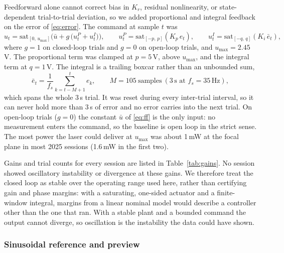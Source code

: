 Feedforward alone cannot correct bias in $K_r$, residual nonlinearity, or state-dependent trial-to-trial deviation, so we added proportional and integral feedback on the error of \eqref{eq:error}.
The command at sample $t$ was
%
\begin{equation}
    u_{t} = \mathrm{sat}_{[0,\,u_{\max}]}
            \Big(\bar{u} + g\,\big(u^{P}_{t} + u^{I}_{t}\big)\Big),
    \qquad
    u^{P}_{t} = \mathrm{sat}_{[-p,\,p]}\!\left(K_{p}\,e_{t}\right),
    \qquad
    u^{I}_{t} = \mathrm{sat}_{[-q,\,q]}\!\left(K_{i}\,\bar{e}_{t}\right),
    \label{eq:pi}
\end{equation}
%
where $g = 1$ on closed-loop trials and $g = 0$ on open-loop trials, and $u_{\max} = 2.45$\,V.
The proportional term was clamped at $p = 5$\,V, above $u_{\max}$, and the integral term at $q = 1$\,V.
The integral is a trailing boxcar rather than an unbounded sum,
%
\begin{equation}
    \bar{e}_{t} = \frac{1}{f_{s}}\sum_{k = t - M + 1}^{t} e_{k},
    \qquad M = 105 \ \text{samples} \ (3\,\text{s at } f_s = 35\,\text{Hz}),
    \label{eq:integral}
\end{equation}
%
which spans the whole 3\,s trial.
It was reset during every inter-trial interval, so it can never hold more than 3\,s of error and no error carries into the next trial.
On open-loop trials ($g = 0$) the constant $\bar u$ of \eqref{eq:ff} is the only input: no measurement enters the command, so the baseline is open loop in the strict sense.
The most power the laser could deliver at $u_{\max}$ was about 1\,mW at the focal plane in most 2025 sessions (1.6\,mW in the first two).

Gains and trial counts for every session are listed in Table~\ref{tab:gains}.
No session showed oscillatory instability or divergence at these gains.
We therefore treat the closed loop as stable over the operating range used here, rather than certifying gain and phase margins: with a saturating, one-sided actuator and a finite-window integral, margins from a linear nominal model would describe a controller other than the one that ran.
With a stable plant and a bounded command the output cannot diverge, so oscillation is the instability the data could have shown.

\subsubsection*{Sinusoidal reference and preview}

